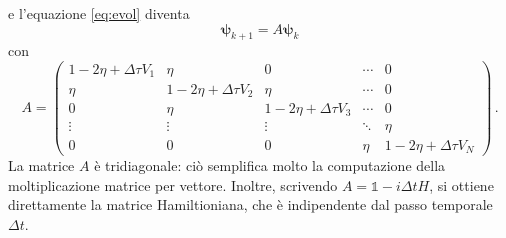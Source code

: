 \documentclass[a4paper, titlepage]{article}
\numberwithin{equation}{section}
\begin{document}
e l'equazione \eqref{eq:evol} diventa
\begin{equation}
    \bm{\psi}_{k+1} = A\bm{\psi}_k
    \label{eq:evol_mat}
\end{equation}
con
\begin{equation*} 
    A = \begin{pmatrix}
    1-2\eta + \Delta\tau V_1 & \eta & 0 & \cdots & 0 \\
    \eta & 1-2\eta + \Delta\tau V_2 & \eta & \cdots & 0 \\
     0 & \eta & 1-2\eta + \Delta\tau V_3 & \cdots & 0 \\
    \vdots & \vdots & \vdots & \ddots & \eta \\
    0 & 0 & 0 & \eta & 1-2\eta + \Delta\tau V_N 
    \end{pmatrix}\, . 
\end{equation*}
La matrice $A$ è tridiagonale: ciò semplifica molto la computazione della moltiplicazione matrice per vettore. Inoltre, scrivendo $A = \mathbb{1} - i\Delta t H$, si ottiene direttamente la matrice Hamiltioniana, che è indipendente dal passo temporale $\Delta t$.
\end{document}

